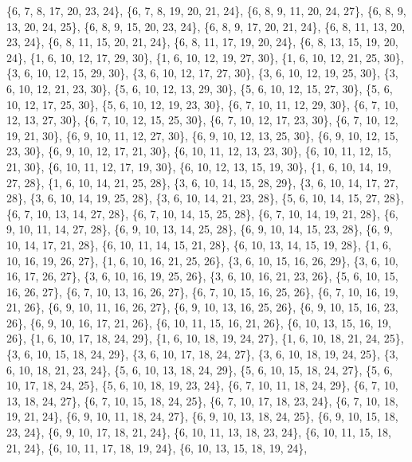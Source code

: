 \documentclass[11pt,a4paper]{article}
\begin{document}
{\{6, 7, 8, 17, 20, 23, 24\}, \{6, 7, 8, 19, 20, 21, 24\}, \{6, 8, 9, 11, 20, 24, 27\}, \{6, 8, 9, 13, 20, 24, 25\}, \{6, 8, 9, 15, 20, 23, 24\},
\{6, 8, 9, 17, 20, 21, 24\}, \{6, 8, 11, 13, 20, 23, 24\}, \{6, 8, 11, 15, 20, 21, 24\}, \{6, 8, 11, 17, 19, 20, 24\}, \{6, 8, 13, 15, 19, 20, 24\},
\{1, 6, 10, 12, 17, 29, 30\}, \{1, 6, 10, 12, 19, 27, 30\}, \{1, 6, 10, 12, 21, 25, 30\}, \{3, 6, 10, 12, 15, 29, 30\}, \{3, 6, 10, 12, 17, 27, 30\},
\{3, 6, 10, 12, 19, 25, 30\}, \{3, 6, 10, 12, 21, 23, 30\}, \{5, 6, 10, 12, 13, 29, 30\}, \{5, 6, 10, 12, 15, 27, 30\}, \{5, 6, 10, 12, 17, 25, 30\},
\{5, 6, 10, 12, 19, 23, 30\}, \{6, 7, 10, 11, 12, 29, 30\}, \{6, 7, 10, 12, 13, 27, 30\}, \{6, 7, 10, 12, 15, 25, 30\}, \{6, 7, 10, 12, 17, 23, 30\},
\{6, 7, 10, 12, 19, 21, 30\}, \{6, 9, 10, 11, 12, 27, 30\}, \{6, 9, 10, 12, 13, 25, 30\}, \{6, 9, 10, 12, 15, 23, 30\}, \{6, 9, 10, 12, 17, 21, 30\},
\{6, 10, 11, 12, 13, 23, 30\}, \{6, 10, 11, 12, 15, 21, 30\}, \{6, 10, 11, 12, 17, 19, 30\}, \{6, 10, 12, 13, 15, 19, 30\}, \{1, 6, 10, 14, 19, 27, 28\},
\{1, 6, 10, 14, 21, 25, 28\}, \{3, 6, 10, 14, 15, 28, 29\}, \{3, 6, 10, 14, 17, 27, 28\}, \{3, 6, 10, 14, 19, 25, 28\}, \{3, 6, 10, 14, 21, 23, 28\},
\{5, 6, 10, 14, 15, 27, 28\}, \{6, 7, 10, 13, 14, 27, 28\}, \{6, 7, 10, 14, 15, 25, 28\}, \{6, 7, 10, 14, 19, 21, 28\}, \{6, 9, 10, 11, 14, 27, 28\},
\{6, 9, 10, 13, 14, 25, 28\}, \{6, 9, 10, 14, 15, 23, 28\}, \{6, 9, 10, 14, 17, 21, 28\}, \{6, 10, 11, 14, 15, 21, 28\}, \{6, 10, 13, 14, 15, 19, 28\},
\{1, 6, 10, 16, 19, 26, 27\}, \{1, 6, 10, 16, 21, 25, 26\}, \{3, 6, 10, 15, 16, 26, 29\}, \{3, 6, 10, 16, 17, 26, 27\}, \{3, 6, 10, 16, 19, 25, 26\},
\{3, 6, 10, 16, 21, 23, 26\}, \{5, 6, 10, 15, 16, 26, 27\}, \{6, 7, 10, 13, 16, 26, 27\}, \{6, 7, 10, 15, 16, 25, 26\}, \{6, 7, 10, 16, 19, 21, 26\},
\{6, 9, 10, 11, 16, 26, 27\}, \{6, 9, 10, 13, 16, 25, 26\}, \{6, 9, 10, 15, 16, 23, 26\}, \{6, 9, 10, 16, 17, 21, 26\}, \{6, 10, 11, 15, 16, 21, 26\},
\{6, 10, 13, 15, 16, 19, 26\}, \{1, 6, 10, 17, 18, 24, 29\}, \{1, 6, 10, 18, 19, 24, 27\}, \{1, 6, 10, 18, 21, 24, 25\}, \{3, 6, 10, 15, 18, 24, 29\},
\{3, 6, 10, 17, 18, 24, 27\}, \{3, 6, 10, 18, 19, 24, 25\}, \{3, 6, 10, 18, 21, 23, 24\}, \{5, 6, 10, 13, 18, 24, 29\}, \{5, 6, 10, 15, 18, 24, 27\},
\{5, 6, 10, 17, 18, 24, 25\}, \{5, 6, 10, 18, 19, 23, 24\}, \{6, 7, 10, 11, 18, 24, 29\}, \{6, 7, 10, 13, 18, 24, 27\}, \{6, 7, 10, 15, 18, 24, 25\},
\{6, 7, 10, 17, 18, 23, 24\}, \{6, 7, 10, 18, 19, 21, 24\}, \{6, 9, 10, 11, 18, 24, 27\}, \{6, 9, 10, 13, 18, 24, 25\}, \{6, 9, 10, 15, 18, 23, 24\},
\{6, 9, 10, 17, 18, 21, 24\}, \{6, 10, 11, 13, 18, 23, 24\}, \{6, 10, 11, 15, 18, 21, 24\}, \{6, 10, 11, 17, 18, 19, 24\}, \{6, 10, 13, 15, 18, 19, 24\},
}
\end{document}
